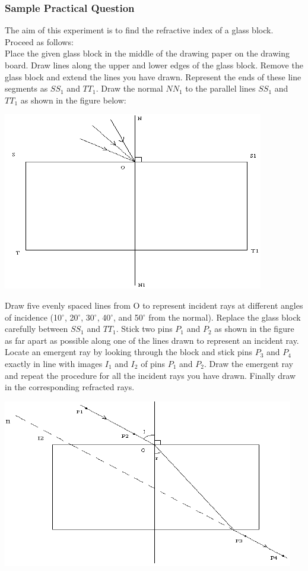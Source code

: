 \subsubsection{Sample Practical Question}

The aim of this experiment is to find the refractive index of a glass block. Proceed
as follows:\\

Place the given glass block in the middle of the drawing paper on the drawing
board. Draw lines along the upper and lower edges of the glass block. Remove the
glass block and extend the lines you have drawn. Represent the ends of these line
segments as $SS_1$ and $TT_1$. Draw the normal $NN_1$ to the parallel lines $SS_1$ and
$TT_1$ as shown in the figure below:

\begin{center}
\includegraphics{./img/light-block-1.png}
\end{center}

Draw five evenly spaced lines from O to represent incident rays at different
angles of incidence (10$^\circ$, 20$^\circ$, 30$^\circ$, 40$^\circ$, and 50$^\circ$ from the normal). Replace the
glass block carefully between $SS_1$ and $TT_1$. Stick two pins $P_1$ and $P_2$ as shown in
the figure as far apart as possible along one of the lines drawn to represent an
incident ray. Locate an emergent ray by looking through the block and stick pins
$P_3$ and $P_4$ exactly in line with images $I_1$ and $I_2$ of pins $P_1$ and $P_2$. Draw the
emergent ray and repeat the procedure for all the incident rays you have drawn. Finally draw in the corresponding refracted rays.

\begin{center}
\includegraphics{./img/light-block-2.png}
\end{center}


